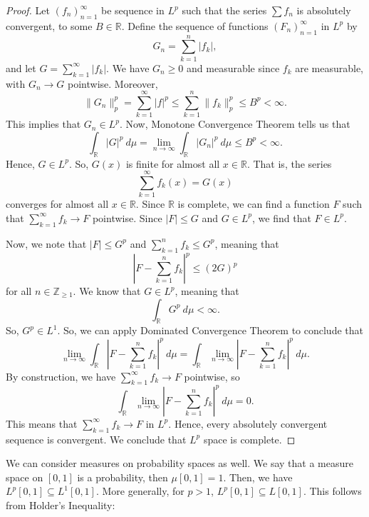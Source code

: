 \documentclass[a4paper, openany]{memoir}
\theoremstyle{definition}
\theoremstyle{plain}
\begin{document}
    \begin{proof}
        Let $(f_n)_{n=1}^\infty$ be sequence in $L^p$ such that the series $\sum f_n$ is absolutely convergent, to some $B \in \mathbb{R}$. Define the sequence of functions $(F_n)_{n=1}^\infty$ in $L^p$ by
        \[G_n = \sum_{k=1}^n |f_k|,\]
        and let $G = \sum_{k=1}^{\infty} |f_k|$. We have $G_n \geq 0$ and measurable since $f_k$ are measurable, with $G_n \to G$ pointwise. Moreover,
        \[\lVert G_n \rVert_p^p = \sum_{k=1}^\infty |f|^p \leq \sum_{k=1}^n \lVert f_k \rVert_p^p \leq B^p < \infty.\]
        This implies that $G_n \in L^p$. Now, Monotone Convergence Theorem tells us that 
        \[\int_{\mathbb{R}} |G|^p \ d\mu = \lim_{n \to \infty} \int_{\mathbb{R}} |G_n|^p \ d\mu \leq B^p < \infty.\]
        Hence, $G \in L^p$. So, $G(x)$ is finite for almost all $x \in \mathbb{R}$. That is, the series
        \[\sum_{k=1}^\infty f_k(x) = G(x)\]
        converges for almost all $x \in \mathbb{R}$. Since $\mathbb{R}$ is complete, we can find a function $F$ such that $\sum_{k=1}^\infty f_k \to F$ pointwise. Since $|F| \leq G$ and $G \in L^p$, we find that $F \in L^p$.

        Now, we note that $|F| \leq G^p$ and $\sum_{k=1}^{n} f_k \leq G^p$, meaning that
        \[\left|F - \sum_{k=1}^{n} f_k\right|^p \leq (2G)^p\]
        for all $n \in \mathbb{Z}_{\geq 1}$. We know that $G \in L^p$, meaning that
        \[\int_{\mathbb{R}} G^p \ d\mu < \infty.\]
        So, $G^p \in L^1$. So, we can apply Dominated Convergence Theorem to conclude that
        \[\lim_{n \to \infty} \int_{\mathbb{R}} \left|F - \sum_{k=1}^{n} f_k\right|^p \ d\mu = \int_{\mathbb{R}} \lim_{n \to \infty} \left|F - \sum_{k=1}^{n} f_k\right|^p \ d\mu.\]
        By construction, we have $\sum_{k=1}^\infty f_k \to F$ pointwise, so
        \[\int_{\mathbb{R}} \lim_{n \to \infty} \left|F - \sum_{k=1}^{n} f_k\right|^p \ d\mu = 0.\]
        This means that $\sum_{k=1}^\infty f_k \to F$ in $L^p$. Hence, every absolutely convergent sequence is convergent. We conclude that $L^p$ space is complete.
    \end{proof}

    We can consider measures on probability spaces as well. We say that a measure space on $[0, 1]$ is a probability, then $\mu [0, 1] = 1$. Then, we have $L^p[0, 1] \subseteq L^1[0, 1]$. More generally, for $p > 1$, $L^p[0, 1] \subseteq L[0, 1]$. This follows from Holder's Inequality: 
\end{document}
